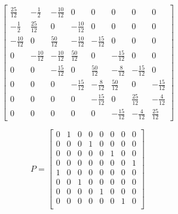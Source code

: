 \documentclass[a4paper, 12pt]{article}
\begin{document}
\[
\begin{bmatrix}
\frac{25}{12} & -\frac{1}{2} & -\frac{10}{12} & 0 & 0 & 0 & 0 & 0 \\
-\frac{1}{2} & \frac{25}{12} & 0 & -\frac{10}{12} & 0 & 0 & 0 & 0 \\
-\frac{10}{12} & 0 & \frac{50}{12} & -\frac{10}{12} & -\frac{15}{12} & 0 & 0 & 0 \\
0 & -\frac{10}{12} & -\frac{10}{12} & \frac{50}{12} & 0 & -\frac{15}{12} & 0 & 0 \\
0 & 0 & -\frac{15}{12} & 0 & \frac{50}{12} & -\frac{8}{12} & -\frac{15}{12} & 0 \\
0 & 0 & 0 & -\frac{15}{12} & -\frac{8}{12} & \frac{50}{12} & 0 & -\frac{15}{12} \\
0 & 0 & 0 & 0 & -\frac{15}{12} & 0 & \frac{25}{12} & -\frac{4}{12} \\
0 & 0 & 0 & 0 & 0 & -\frac{15}{12} & -\frac{4}{12} & \frac{25}{12}
\end{bmatrix}
\]

\[
P = 
\begin{bmatrix}
0 & 1 & 0 & 0 & 0 & 0 & 0 & 0 \\ %
0 & 0 & 0 & 1 & 0 & 0 & 0 & 0 \\ %
0 & 0 & 0 & 0 & 0 & 1 & 0 & 0 \\ %
0 & 0 & 0 & 0 & 0 & 0 & 0 & 1 \\ %
1 & 0 & 0 & 0 & 0 & 0 & 0 & 0 \\ %
0 & 0 & 1 & 0 & 0 & 0 & 0 & 0 \\ %
0 & 0 & 0 & 0 & 1 & 0 & 0 & 0 \\ %
0 & 0 & 0 & 0 & 0 & 0 & 1 & 0 \\ %
\end{bmatrix}
\]
\end{document}
